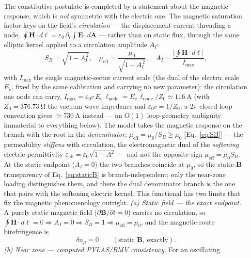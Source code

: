 \documentclass[aps,prd,twocolumn,superscriptaddress,nofootinbib,longbibliography]{revtex4-2}
\newcommand{\Ec}{E_{\mathrm{c}}}
\begin{document}
The constitutive postulate is completed by a statement about the magnetic
response, which is \emph{not} symmetric with the electric one. The magnetic
saturation factor keys on the field's \emph{circulation} --- the displacement
current threading a node, $\oint\mathbf H\cdot d\boldsymbol\ell=\varepsilon_0\,
\partial_t\!\int\mathbf E\cdot d\mathbf A$ --- rather than on static flux, through
the same elliptic kernel applied to a circulation amplitude $A_I$:
%
\begin{equation}
  S_B=\sqrt{1-A_I^{\,2}},\quad
  \mu_{\mathrm{eff}}=\frac{\mu_0}{\sqrt{1-A_I^{\,2}}},\quad
  A_I=\frac{\bigl|\oint\mathbf H\cdot d\boldsymbol\ell\bigr|}{I_{\max}},
  \label{eq:SB}
\end{equation}
%
with $I_{\max}$ the single magnetic-sector current scale (the dual of the electric
scale $\Ec$, fixed by the same calibration and carrying no new parameter): the
circulation one node can carry, $I_{\max}=\varepsilon_0 c\,\Ec\,\ell_{\mathrm{node}}
=\Ec\,\ell_{\mathrm{node}}/Z_0\simeq\SI{116}{\ampere}$ (with
$Z_0=\SI{376.73}{\ohm}$ the vacuum wave impedance and $\varepsilon_0 c=1/Z_0$; a
$2\pi$ closed-loop convention gives $\simeq\SI{730}{\ampere}$ instead --- an
$O(1)$ loop-geometry ambiguity immaterial to everything below). The model takes
the magnetic response on the branch with the root in the \emph{denominator},
$\mu_{\mathrm{eff}}=\mu_0/S_B\ge\mu_0$ [Eq.~\eqref{eq:SB}] --- the permeability
\emph{stiffens} with circulation, the electromagnetic dual of the \emph{softening}
electric permittivity $\varepsilon_{\mathrm{eff}}=\varepsilon_0\sqrt{1-A^2}$ ---
and not the opposite-sign $\mu_{\mathrm{eff}}=\mu_0 S_B$. At the static endpoint
($A_I=0$) the two branches coincide at $\mu_0$, so the static-$\mathbf B$
transparency of Eq.~\eqref{eq:staticB} is branch-independent; only the near-zone
loading distinguishes them, and there the dual denominator branch is the one that
pairs with the softening electric kernel. This functional has two limits that fix
the magnetic phenomenology outright.
\emph{(a) Static field --- the exact endpoint.} A purely static magnetic field
($\partial\mathbf B/\partial t=0$) carries no circulation, so
$\oint\mathbf H\cdot d\boldsymbol\ell=0\Rightarrow A_I=0\Rightarrow S_B=1\Rightarrow
\mu_{\mathrm{eff}}=\mu_0$, and the magnetic-route birefringence is
%
\begin{equation}
  \delta n_\mu=0\qquad(\text{static }\mathbf B,\ \text{exactly}).
  \label{eq:staticB}
\end{equation}
%
\emph{(b) Near zone --- computed PVLAS/BMV consistency.} For an oscillating
\end{document}
